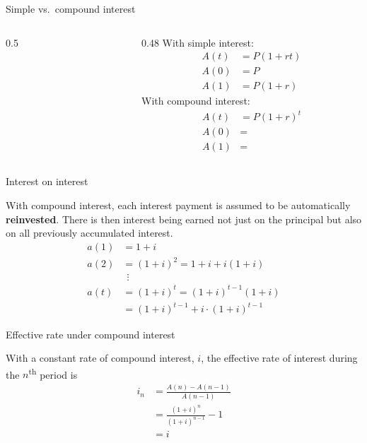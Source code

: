 \documentclass{beamer}
\begin{document}
\begin{frame}{Simple vs.\ compound interest}

\begin{columns}
\begin{column}{0.5\textwidth}
\centering
{}
\end{column}
\begin{column}{0.48\textwidth}
With simple interest:
\begin{align*}
A(t) &= P(1+rt) \\
A(0) &= P \\
A(1) &= P(1+r)
\end{align*}
With compound interest:
\begin{align*}
A(t) &= P(1+r)^t \\
A(0) &= \\
A(1) &=
\end{align*}
\end{column}
\end{columns}

\end{frame}

\begin{frame}{Interest on interest}

With compound interest, each interest payment is assumed to be automatically \textbf{reinvested}. There is then interest being earned not just on the principal but also on all previously accumulated interest.
\begin{align*}
a(1) &= 1 + i \\
a(2) &= (1+i)^2 = 1 + i + i(1+i) \\
&\ \ \vdots \\
a(t) &= (1+i)^t = (1+i)^{t-1}(1+i) \\
&= (1+i)^{t-1} + i \cdot (1+i)^{t-1}
\end{align*}

\end{frame}

\begin{frame}{Effective rate under compound interest}

With a constant rate of compound interest, $i$, the effective rate of interest during the $n$\textsuperscript{th} period is
\begin{align*}
i_n &= \frac{A(n) - A(n-1)}{A(n-1)} \\[1ex]
&= \frac{(1+i)^n}{(1+i)^{n-1}} - 1 \\[1ex]
&= i
\end{align*}

\end{frame}
\end{document}
